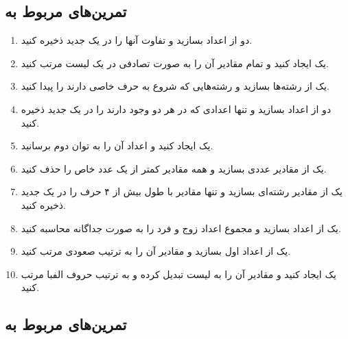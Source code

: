 \documentclass[a4paper,12pt]{article}
\begin{document}
	\subsection*{تمرین‌های مربوط به }
	
	\begin{enumerate}
		\item دو  از اعداد بسازید و تفاوت آنها را در یک  جدید ذخیره کنید.
		\item یک  ایجاد کنید و تمام مقادیر آن را به صورت تصادفی در یک لیست مرتب کنید.
		\item یک  از رشته‌ها بسازید و رشته‌هایی که شروع به حرف خاصی دارند را پیدا کنید.
		\item دو  از اعداد بسازید و تنها اعدادی که در هر دو وجود دارند را در یک  جدید ذخیره کنید.
		\item یک  ایجاد کنید و اعداد آن را به توان دوم برسانید.
		\item یک  از مقادیر عددی بسازید و همه مقادیر کمتر از یک عدد خاص را حذف کنید.
		\item یک  از مقادیر رشته‌ای بسازید و تنها مقادیر با طول بیش از ۴ حرف را در یک  جدید ذخیره کنید.
		\item یک  از اعداد بسازید و مجموع اعداد زوج و فرد را به صورت جداگانه محاسبه کنید.
		\item یک  از اعداد اول بسازید و مقادیر آن را به ترتیب صعودی مرتب کنید.
		\item یک  ایجاد کنید و مقادیر آن را به لیست تبدیل کرده و به ترتیب حروف الفبا مرتب کنید.
	\end{enumerate}
	
	\subsection*{تمرین‌های مربوط به }
	
\end{document}
